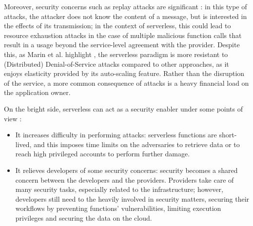 \documentclass[
	a4paper, %
	12pt,
	twoside, %
]{LTJournalArticle}
\begin{document}
Moreover, security concerns such as replay attacks are significant \cite{shafiei_serverless_2022}: in this type of attacks, the attacker does not know the content of a message, but is interested in the effects of its transmission; in the context of serverless, this could lead to resource exhaustion attacks in the case of multiple malicious function calls that result in a usage beyond the service-level agreement with the provider. Despite this, as Marin et al. highlight \cite{marin_serverless_2022}, the serverless paradigm is more resistant to (Distributed) Denial-of-Service attacks compared to other approaches, as it enjoys elasticity provided by its auto-scaling feature. Rather than the disruption of the service, a more common consequence of attacks is a heavy financial load on the application owner.

On the bright side, serverless can act as a security enabler under some points of view \cite{marin_serverless_2022}:
\begin{itemize}
	\item It increases difficulty in performing attacks: serverless functions are short-lived, and this imposes time limits on the adversaries to retrieve data or to reach high privileged accounts to perform further damage.
	\item It relieves developers of some security concerns: security becomes a shared concern between the developers and the providers. Providers take care of many security tasks, especially related to the infrastructure; however, developers still need to the heavily involved in security matters, securing their workflows by preventing functions' vulnerabilities, limiting execution privileges and securing the data on the cloud. 
\end{itemize}
\end{document}
